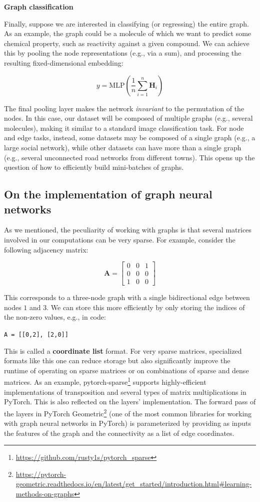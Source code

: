 \textbf{Graph classification}

Finally, suppose we are interested in classifying (or regressing) the entire graph. As an example, the graph could be a molecule of which we want to predict some chemical property, such as reactivity against a given compound. We can achieve this by pooling the node representations (e.g., via a sum), and processing the resulting fixed-dimensional embedding:

$$
y=\text{MLP}\left(\frac{1}{n}\sum_{i=1}^n \mathbf{H}_i\right)
$$

The final pooling layer makes the network \textit{invariant} to the permutation of the nodes. In this case, our dataset will be composed of multiple graphs (e.g., several molecules), making it similar to a standard image classification task. For node and edge tasks, instead, some datasets may be composed of a single graph (e.g., a large social network), while other datasets can have more than a single graph (e.g., several unconnected road networks from different towns). This opens up the question of how to efficiently build mini-batches of graphs.

\subsection{On the implementation of graph neural networks} \addteacup

As we mentioned, the peculiarity of working with graphs is that several matrices involved in our computations can be very sparse. For example, consider the following adjacency matrix:

$$
\mathbf{A} = \begin{bmatrix} 0 & 0 & 1 \\ 0 & 0 & 0 \\ 1 & 0 & 0 \end{bmatrix}
$$

This corresponds to a three-node graph with a single bidirectional edge between nodes $1$ and $3$. We can store this more efficiently by only storing the indices of the non-zero values, e.g., in code:

{\begin{center}\footnotesize
\noindent\texttt{A = [[0,2], [2,0]]}
\end{center}
}

This is called a \textbf{coordinate list} format. For very sparse matrices, specialized formats like this one can reduce storage but also significantly improve the runtime of operating on sparse matrices or on combinations of sparse and dense matrices. As an example, pytorch-sparse\footnote{\url{https://github.com/rusty1s/pytorch_sparse}} supports highly-efficient implementations of transposition and several types of matrix multiplications in PyTorch. This is also reflected on the layers’ implementation. The forward pass of the layers in PyTorch Geometric\footnote{\url{https://pytorch-geometric.readthedocs.io/en/latest/get_started/introduction.html\#learning-methods-on-graphs}} (one of the most common libraries for working with graph neural networks in PyTorch) is parameterized by providing as inputs the features of the graph and the connectivity as a list of edge coordinates.

